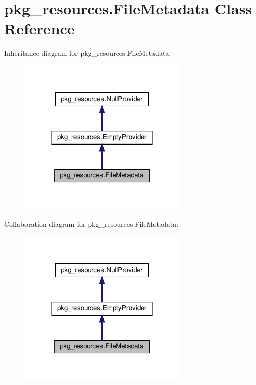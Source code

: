 \hypertarget{classpkg__resources_1_1FileMetadata}{}\section{pkg\+\_\+resources.\+File\+Metadata Class Reference}
\label{classpkg__resources_1_1FileMetadata}


Inheritance diagram for pkg\+\_\+resources.\+File\+Metadata\+:
\nopagebreak
\begin{figure}[H]
\begin{center}
\leavevmode
\includegraphics[width=228pt]{classpkg__resources_1_1FileMetadata__inherit__graph}
\end{center}
\end{figure}


Collaboration diagram for pkg\+\_\+resources.\+File\+Metadata\+:
\nopagebreak
\begin{figure}[H]
\begin{center}
\leavevmode
\includegraphics[width=228pt]{classpkg__resources_1_1FileMetadata__coll__graph}
\end{center}
\end{figure}

